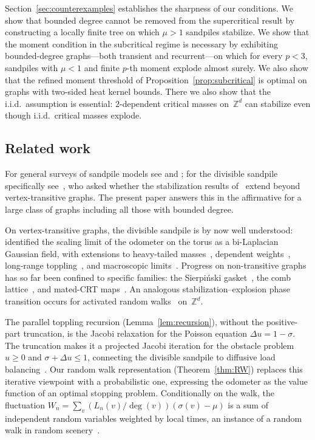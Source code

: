 \documentclass[aop]{imsart}
\theoremstyle{plain}
\theoremstyle{definition}
\newcommand{\Z}{\mathbb{Z}}
\begin{document}
	Section~\ref{sec:counterexamples} establishes the sharpness of our conditions. We show that bounded degree cannot be removed from the supercritical result by constructing a locally finite tree on which $\mu>1$ sandpiles stabilize. We show that the moment condition in the subcritical regime is necessary by exhibiting bounded-degree graphs---both transient and recurrent---on which for every $p<3$, sandpiles with $\mu<1$ and finite $p$-th moment explode almost surely. We also show that the refined moment threshold of Proposition~\ref{prop:subcritical} is optimal on graphs with two-sided heat kernel bounds. There we also show that the i.i.d.\ assumption is essential: $2$-dependent critical masses on~$\Z^d$ can stabilize even though i.i.d.\ critical masses explode.
	
	\subsection{Related work}
	For general surveys of sandpile models see \citet{Jarai18} and \citet{LP17}; for the divisible sandpile specifically see~\citet{survey-ruszel-div-sandpile}, who asked whether the stabilization results of~\citet{div-sand-crit} extend beyond vertex-transitive graphs. The present paper answers this in the affirmative for a large class of graphs including all those with bounded degree.
	
	On vertex-transitive graphs, the divisible sandpile is by now well understood: \citet*{MR3877548} identified the scaling limit of the odometer on the torus as a bi-Laplacian Gaussian field, with extensions to heavy-tailed masses~\citep{MR3834853}, dependent weights~\citep{CdGR20}, long-range toppling~\citep{MR3796366, MR4282689}, and macroscopic limits~\citep{BouRabee-abelian-sandpile}. Progress on non-transitive graphs has so far been confined to specific families: the Sierpi\'nski gasket~\citep{MR3957187, KaiserSH}, the comb lattice~\citep{HussSava12}, and mated-CRT maps~\citep{BouRabeeGwynne-IDLA, BouRabeeGwynne-harmonic}. An analogous stabilization--explosion phase transition occurs for activated random walks~\citep{RollaSidoravicius12, SidoraviciusTeixeira17, johnson2025odometer} on~$\Z^d$.
	
	The parallel toppling recursion (Lemma~\ref{lem:recursion}), without the positive-part truncation, is the Jacobi relaxation for the Poisson equation $\Delta u = 1 - \sigma$. The truncation makes it a projected Jacobi iteration for the obstacle problem $u \geq 0$ and $\sigma + \Delta u \leq 1$, connecting the divisible sandpile to diffusive load balancing~\citep{Cybenko89, RSW}. Our random walk representation (Theorem~\ref{thm:RW}) replaces this iterative viewpoint with a probabilistic one, expressing the odometer as the value function of an optimal stopping problem. Conditionally on the walk, the fluctuation $W_n = \sum_v (L_n(v)/\deg(v))(\sigma(v)-\mu)$ is a sum of independent random variables weighted by local times, an instance of a random walk in random scenery~\citep{KestenSpitzer79}.
	
\end{document}
